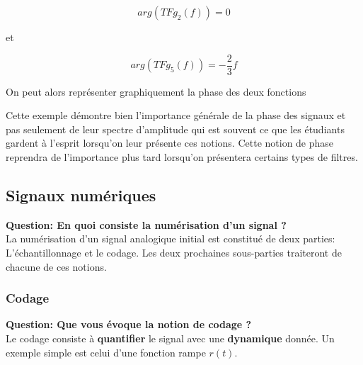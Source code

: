 \documentclass[11pt,a4paper]{article}
\begin{document}
\[ arg(TF{g_2}(f)) =   0 \]

et

\[ arg(TF{g_5}(f)) =   -\frac{2}{3} f\]

On peut alors représenter graphiquement la phase des deux fonctions

\begin{center}
\end{center}

Cette exemple démontre bien l'importance générale de la phase des signaux et pas seulement de leur spectre d'amplitude qui est souvent ce que les étudiants gardent à l'esprit lorsqu'on leur présente ces notions. Cette notion de phase reprendra de l'importance plus tard lorsqu'on présentera certains types de filtres.

\subsection{Signaux numériques}

\textbf{Question: En quoi consiste la numérisation d'un signal ?} \\

La numérisation d'un signal analogique initial est constitué de deux parties: L'échantillonnage et le codage. Les deux prochaines sous-parties traiteront de chacune de ces notions.

\subsubsection{Codage}

\textbf{Question: Que vous évoque la notion de codage ?} \\

Le codage consiste à \textbf{quantifier} le signal avec une \textbf{dynamique} donnée. Un exemple simple est celui d'une fonction rampe $r(t)$.\\
\end{document}
